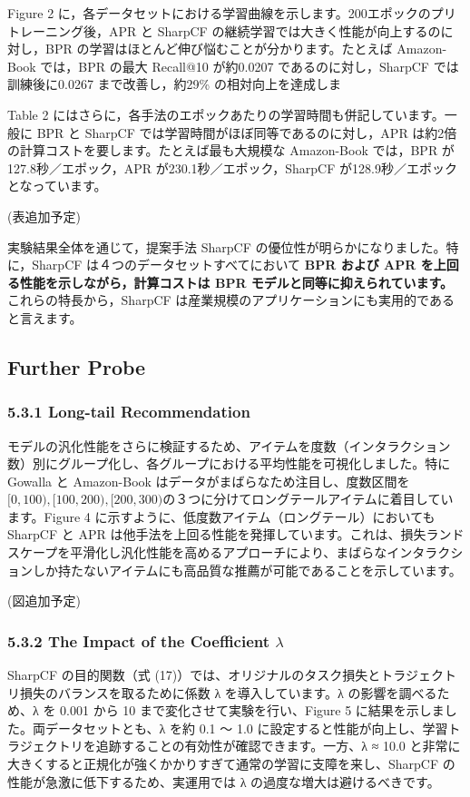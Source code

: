 \documentclass[11pt,a4paper]{article}
\begin{document}
Figure 2 に，各データセットにおける学習曲線を示します。200エポックのプリトレーニング後，APR と SharpCF の継続学習では大きく性能が向上するのに対し，BPR の学習はほとんど伸び悩むことが分かります。たとえば Amazon-Book では，BPR の最大 Recall@10 が約0.0207 であるのに対し，SharpCF では訓練後に0.0267 まで改善し，約29\% の相対向上を達成しま

Table 2 にはさらに，各手法のエポックあたりの学習時間も併記しています。一般に BPR と SharpCF では学習時間がほぼ同等であるのに対し，APR は約2倍の計算コストを要します。たとえば最も大規模な Amazon-Book では，BPR が127.8秒／エポック，APR が230.1秒／エポック，SharpCF が128.9秒／エポックとなっています。

(表追加予定)

実験結果全体を通じて，提案手法 SharpCF の優位性が明らかになりました。特に，SharpCF は４つのデータセットすべてにおいて \textbf{BPR および APR を上回る性能を示しながら，計算コストは BPR モデルと同等に抑えられています。}これらの特長から，SharpCF は産業規模のアプリケーションにも実用的であると言えます。

\subsection{Further Probe}

\subsubsection{5.3.1 Long-tail Recommendation}
モデルの汎化性能をさらに検証するため、アイテムを度数（インタラクション数）別にグループ化し、各グループにおける平均性能を可視化しました。特に Gowalla と Amazon-Book はデータがまばらなため注目し、度数区間を $[0,100),[100,200),[200,300)$の３つに分けてロングテールアイテムに着目しています。Figure 4 に示すように、低度数アイテム（ロングテール）においても SharpCF と APR は他手法を上回る性能を発揮しています。これは、損失ランドスケープを平滑化し汎化性能を高めるアプローチにより、まばらなインタラクションしか持たないアイテムにも高品質な推薦が可能であることを示しています。

(図追加予定)

\subsubsection{5.3.2 The Impact of the Coefficient $\lambda$}
SharpCF の目的関数（式 (17)）では、オリジナルのタスク損失とトラジェクトリ損失のバランスを取るために係数 λ を導入しています。λ の影響を調べるため、λ を 0.001 から 10 まで変化させて実験を行い、Figure 5 に結果を示しました。両データセットとも、λ を約 0.1 〜 1.0 に設定すると性能が向上し、学習トラジェクトリを追跡することの有効性が確認できます。一方、λ ≈ 10.0 と非常に大きくすると正規化が強くかかりすぎて通常の学習に支障を来し、SharpCF の性能が急激に低下するため、実運用では λ の過度な増大は避けるべきです。
\end{document}
